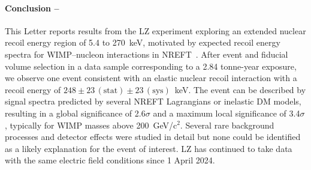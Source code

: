 \paragraph{Conclusion --\label{sec:conclusion}}

This Letter reports results from the LZ experiment exploring an extended nuclear recoil energy region of 5.4 to 270~keV, motivated by expected recoil energy spectra for WIMP--nucleon interactions in NREFT~\cite{Fitzpatrick:EFT}.
After event and fiducial volume selection in a data sample corresponding to a 2.84 tonne-year exposure, we observe one event consistent with an elastic nuclear recoil interaction with a recoil energy of $248\pm23\,\mathrm{(stat)}\pm23\,\mathrm{(sys)}$~keV. 
The event can be described by signal spectra predicted by several NREFT Lagrangians or inelastic DM models, resulting in a global significance of 2.6$\sigma$ and a maximum local significance of 3.4$\sigma$, typically for WIMP masses above 200~GeV/c$^2$.
Several rare background processes and detector effects were studied in detail but none could be identified as a likely explanation for the event of interest. LZ has continued to take data with the same electric field conditions since 1 April 2024.  
